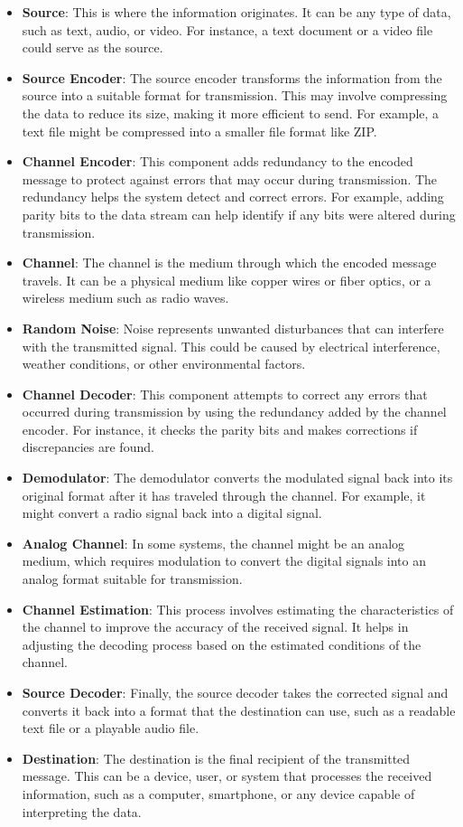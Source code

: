 \documentclass[12pt, oneside]{book}
\begin{document}
\begin{itemize}
	\item \textbf{Source}: This is where the information originates. It can be any type of data, such as text, audio, or video. For instance, a text document or a video file could serve as the source.
	\item \textbf{Source Encoder}: The source encoder transforms the information from the source into a suitable format for transmission. This may involve compressing the data to reduce its size, making it more efficient to send. For example, a text file might be compressed into a smaller file format like ZIP.
	\item \textbf{Channel Encoder}: This component adds redundancy to the encoded message to protect against errors that may occur during transmission. The redundancy helps the system detect and correct errors. For example, adding parity bits to the data stream can help identify if any bits were altered during transmission.
	\item \textbf{Channel}: The channel is the medium through which the encoded message travels. It can be a physical medium like copper wires or fiber optics, or a wireless medium such as radio waves.
	\item \textbf{Random Noise}:  Noise represents unwanted disturbances that can interfere with the transmitted signal. This could be caused by electrical interference, weather conditions, or other environmental factors. 
	\item \textbf{Channel Decoder}:  This component attempts to correct any errors that occurred during transmission by using the redundancy added by the channel encoder. For instance, it checks the parity bits and makes corrections if discrepancies are found.
	\item \textbf{Demodulator}: The demodulator converts the modulated signal back into its original format after it has traveled through the channel. For example, it might convert a radio signal back into a digital signal.
	\item \textbf{Analog Channel}:  In some systems, the channel might be an analog medium, which requires modulation to convert the digital signals into an analog format suitable for transmission.
	\item \textbf{Channel Estimation}: This process involves estimating the characteristics of the channel to improve the accuracy of the received signal. It helps in adjusting the decoding process based on the estimated conditions of the channel.
	\item \textbf{Source Decoder}:  Finally, the source decoder takes the corrected signal and converts it back into a format that the destination can use, such as a readable text file or a playable audio file.
	\item \textbf{Destination}:  The destination is the final recipient of the transmitted message. This can be a device, user, or system that processes the received information, such as a computer, smartphone, or any device capable of interpreting the data.
\end{itemize}
\end{document}
